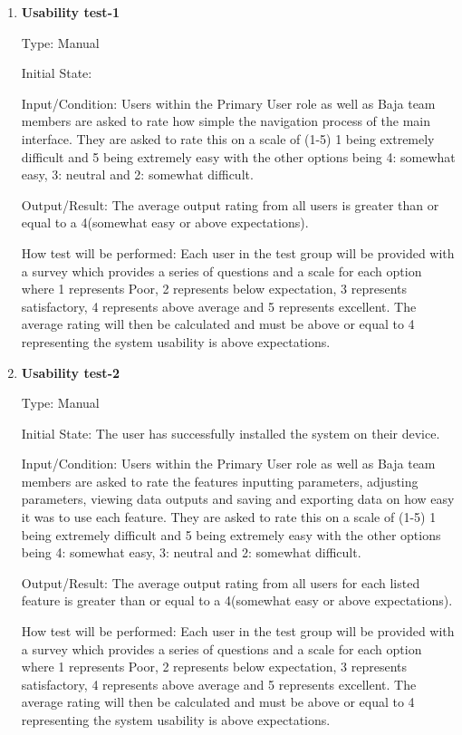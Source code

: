 \documentclass[12pt, titlepage]{article}
\begin{document}
\begin{enumerate}
  \item {} \hypertarget{Usability test-1}{\textbf{Usability test-1}} \label{Usability test-1}


Type: Manual
					
Initial State: 
					
Input/Condition: Users within the Primary User role as well as Baja team members are asked to rate how simple the navigation process of the main interface. 
They are asked to rate this on a scale of (1-5) 1 being extremely difficult and 5 being extremely easy with the other options being 4: somewhat easy, 3: neutral and 2: somewhat difficult. 
					
Output/Result: The average output rating from all users is greater than or equal to a 4(somewhat easy or above expectations).
					
How test will be performed: Each user in the test group will be provided with a survey which provides a series of questions and a scale for each option where 1 represents Poor, 2 represents below expectation, 3 represents satisfactory, 4 represents above average and 5 represents excellent.
The average rating will then be calculated and must be above or equal to 4 representing the system usability is above expectations.  

\item {} \hypertarget{Usability test-2}{\textbf{Usability test-2}} \label{Usability test-2}
  
Type: Manual
            
Initial State: The user has successfully installed the system on their device.
            
Input/Condition: Users within the Primary User role as well as Baja team members are asked to rate the features inputting parameters, adjusting parameters, viewing data outputs and saving and exporting data on how easy it was to use each feature.
They are asked to rate this on a scale of (1-5) 1 being extremely difficult and 5 being extremely easy with the other options being 4: somewhat easy, 3: neutral and 2: somewhat difficult. 
            
Output/Result: The average output rating from all users for each listed feature is greater than or equal to a 4(somewhat easy or above expectations).
            
How test will be performed: Each user in the test group will be provided with a survey which provides a series of questions and a scale for each option where 1 represents Poor, 2 represents below expectation, 3 represents satisfactory, 4 represents above average and 5 represents excellent.
The average rating will then be calculated and must be above or equal to 4 representing the system usability is above expectations. 
  
\end{enumerate}
\end{document}
